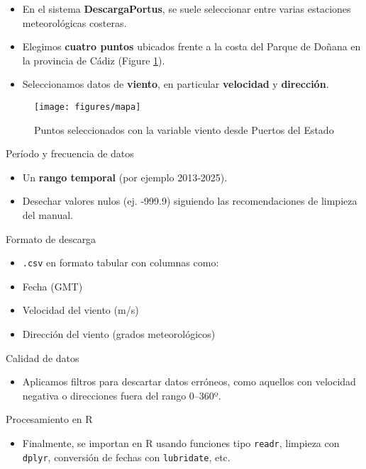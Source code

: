 \documentclass[
]{article}
\providecommand{\tightlist}{%
  \setlength{\itemsep}{0pt}\setlength{\parskip}{0pt}}
\begin{document}
\begin{itemize}
\tightlist
\item
  En el sistema \textbf{DescargaPortus}, se suele seleccionar entre varias estaciones meteorológicas costeras.
\item
  Elegimos \textbf{cuatro puntos} ubicados frente a la costa del Parque de Doñana en la provincia de Cádiz (Figure \ref{fig:mapa}).
\item
  Seleccionamos datos de \textbf{viento}, en particular \textbf{velocidad} y \textbf{dirección}.
\end{itemize}

\begin{figure}

{\centering \texttt{[image: figures/mapa]} 

}

\caption{Puntos seleccionados con la variable viento desde Puertos del Estado}\label{fig:mapa}
\end{figure}

Período y frecuencia de datos

\begin{itemize}
\tightlist
\item
  Un \textbf{rango temporal} (por ejemplo 2013‑2025).
\item
  Desechar valores nulos (ej. ‑999.9) siguiendo las recomendaciones de limpieza del manual.
\end{itemize}

Formato de descarga

\begin{itemize}
\tightlist
\item
  \texttt{.csv} en formato tabular con columnas como:
\item
  Fecha (GMT)
\item
  Velocidad del viento (m/s)
\item
  Dirección del viento (grados meteorológicos)
\end{itemize}

Calidad de datos

\begin{itemize}
\tightlist
\item
  Aplicamos filtros para descartar datos erróneos, como aquellos con velocidad negativa o direcciones fuera del rango 0--360º.
\end{itemize}

Procesamiento en R

\begin{itemize}
\tightlist
\item
  Finalmente, se importan en R usando funciones tipo \texttt{readr}, limpieza con \texttt{dplyr}, conversión de fechas con \texttt{lubridate}, etc.
\end{itemize}
\end{document}
